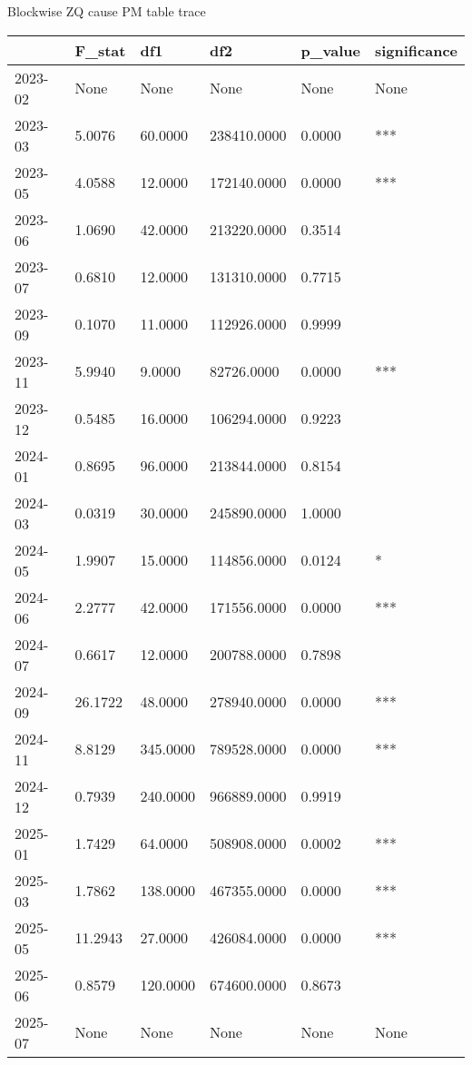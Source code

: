 Blockwise ZQ cause PM table trace

\begin{center}
  \begin{tabular}{l|l|l|l|l|l}
    \hline
  & F\_stat & df1 & df2 & p\_value & significance\\
  \hline
    2023-02 & None & None & None & None & None\\
    \hline
    2023-03 & 5.0076 & 60.0000 & 238410.0000 & 0.0000 & ***\\
    \hline
    2023-05 & 4.0588 & 12.0000 & 172140.0000 & 0.0000 & ***\\
    \hline
    2023-06 & 1.0690 & 42.0000 & 213220.0000 & 0.3514 & \\
    \hline
    2023-07 & 0.6810 & 12.0000 & 131310.0000 & 0.7715 & \\
    \hline
    2023-09 & 0.1070 & 11.0000 & 112926.0000 & 0.9999 & \\
    \hline
    2023-11 & 5.9940 & 9.0000 & 82726.0000 & 0.0000 & ***\\
    \hline
    2023-12 & 0.5485 & 16.0000 & 106294.0000 & 0.9223 & \\
    \hline
    2024-01 & 0.8695 & 96.0000 & 213844.0000 & 0.8154 & \\
    \hline
    2024-03 & 0.0319 & 30.0000 & 245890.0000 & 1.0000 & \\
    \hline
    2024-05 & 1.9907 & 15.0000 & 114856.0000 & 0.0124 & *\\
    \hline
    2024-06 & 2.2777 & 42.0000 & 171556.0000 & 0.0000 & ***\\
    \hline
    2024-07 & 0.6617 & 12.0000 & 200788.0000 & 0.7898 & \\
    \hline
    2024-09 & 26.1722 & 48.0000 & 278940.0000 & 0.0000 & ***\\
    \hline
    2024-11 & 8.8129 & 345.0000 & 789528.0000 & 0.0000 & ***\\
    \hline
    2024-12 & 0.7939 & 240.0000 & 966889.0000 & 0.9919 & \\
    \hline
    2025-01 & 1.7429 & 64.0000 & 508908.0000 & 0.0002 & ***\\
    \hline
    2025-03 & 1.7862 & 138.0000 & 467355.0000 & 0.0000 & ***\\
    \hline
    2025-05 & 11.2943 & 27.0000 & 426084.0000 & 0.0000 & ***\\
    \hline
    2025-06 & 0.8579 & 120.0000 & 674600.0000 & 0.8673 & \\
    \hline
    2025-07 & None & None & None & None & None\\
    \hline
  \end{tabular}
\end{center}


